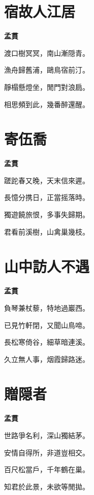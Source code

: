 \documentclass[12pt,a4paper]{ctexbook}
\begin{document}
\section{宿故人江居}
\textbf{孟貫}\par\vspace{0.5em}
渡口樹冥冥，南山漸隠青。\par
漁舟歸舊浦，鷗鳥宿前汀。\par
靜榻懸燈坐，閒門對浪扃。\par
相思頻到此，幾番醉還醒。\par

\section{寄伍喬}
\textbf{孟貫}\par\vspace{0.5em}
蹉跎春又晚，天末信來遲。\par
長憶分携日，正當摇落時。\par
獨遊饒旅恨，多事失歸期。\par
君看前溪樹，山禽巢幾枝。\par

\section{山中訪人不遇}
\textbf{孟貫}\par\vspace{0.5em}
負琴兼杖藜，特地過巖西。\par
已見竹軒閉，又聞山鳥啼。\par
長松寒倚谷，細草暗連溪。\par
久立無人事，烟霞歸路迷。\par

\section{贈隠者}
\textbf{孟貫}\par\vspace{0.5em}
世路爭名利，深山獨結茅。\par
安情自得所，非道豈相交。\par
百尺松當戶，千年鶴在巢。\par
知君於此景，未欲等閒拋。\par
\end{document}
